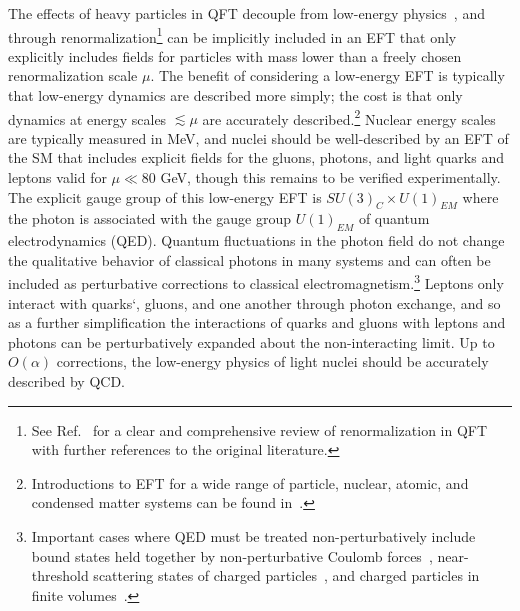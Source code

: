 The effects of heavy particles in QFT decouple from low-energy physics~\cite{Appelquist:1974tg}, and through renormalization\footnote{See Ref.~\cite{Collins:105730} for a clear and comprehensive review of renormalization in QFT with further references to the original literature.} 
can be implicitly included in an EFT 
that only explicitly includes fields for particles with mass lower than a freely chosen renormalization scale $\mu$.
The benefit of considering a low-energy EFT is typically that low-energy dynamics are described more simply; the cost is that only dynamics at energy scales $\lesssim \mu$ are accurately described.\footnote{Introductions to EFT for a wide range of particle, nuclear, atomic, and condensed matter systems can be found in~\cite{Buras:1998raa,Kaplan:2005es,Bedaque:2002mn,Beane:2000fx,Kaplan:1996nv,Scherer:2002tk,Bernard:1995dp,Braaten:2004rn}.}
Nuclear energy scales are typically measured in MeV, and nuclei should be well-described by an EFT of the SM that includes explicit fields for the gluons, photons, and light quarks and leptons valid for $\mu \ll 80$ GeV, though this remains to be verified experimentally. 
The explicit gauge group of this low-energy EFT is $SU(3)_C\times U(1)_{EM}$ where the photon is associated with the gauge group $U(1)_{EM}$ of quantum electrodynamics (QED).
Quantum fluctuations in the photon field do not change the qualitative behavior of classical photons in many systems and can often be included as perturbative corrections to classical electromagnetism.\footnote{Important cases where QED must be treated non-perturbatively include bound states held together by non-perturbative Coulomb forces~\cite{Caswell:1985ui}, near-threshold scattering states of charged particles~\cite{Kong:1999sf}, and charged particles in finite volumes~\cite{Beane:2014qha}.}
Leptons only interact with quarks`, gluons, and one another through photon exchange, and so as a further simplification the interactions of quarks and gluons with leptons and photons can be perturbatively expanded about the non-interacting limit.
Up to $O(\alpha)$ corrections, the low-energy physics of light nuclei should be accurately described by QCD.

